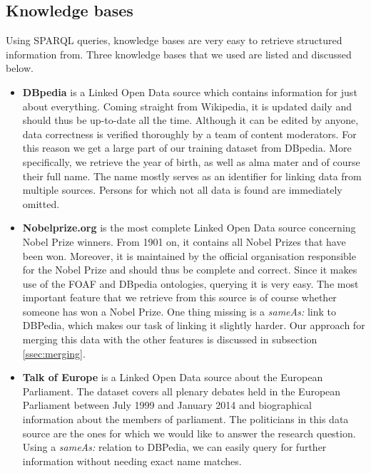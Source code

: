 \subsection{Knowledge bases}
\label{ssec:knowledgebases}

Using SPARQL queries, knowledge bases are very easy to retrieve structured information from. Three knowledge bases that we used are listed and discussed below.

\begin{itemize}
\item{\textbf{DBpedia}} is a Linked Open Data source which contains information for just about everything. Coming straight from Wikipedia, it is updated daily and should thus be up-to-date all the time. Although it can be edited by anyone, data correctness is verified thoroughly by a team of content moderators. For this reason we get a large part of our training dataset from DBpedia. More specifically, we retrieve the year of birth, as well as alma mater and of course their full name. The name mostly serves as an identifier for linking data from multiple sources. Persons for which not all data is found are immediately omitted.

\item{\textbf{Nobelprize.org}} is the most complete Linked Open Data source concerning Nobel Prize winners. From 1901 on, it contains all Nobel Prizes that have been won. Moreover, it is maintained by the official organisation responsible for the Nobel Prize and should thus be complete and correct. Since it makes use of the FOAF and DBpedia ontologies, querying it is very easy. The most important feature that we retrieve from this source is of course whether someone has won a Nobel Prize. One thing missing is a \emph{sameAs:} link to DBPedia, which makes our task of linking it slightly harder. Our approach for merging this data with the other features is discussed in subsection \ref{ssec:merging}.

\item{\textbf{Talk of Europe}} is a Linked Open Data source about the European Parliament. The dataset covers all plenary debates held in the European Parliament between July 1999 and January 2014 and biographical information about the members of parliament. The politicians in this data source are the ones for which we would like to answer the research question. Using a \emph{sameAs:} relation to DBPedia, we can easily query for further information without needing exact name matches.
\end{itemize}

